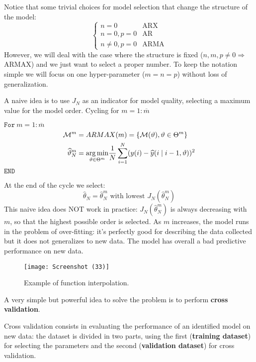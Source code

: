 Notice that some trivial choices for model selection that change the structure of the model:
\begin{equation*}
\begin{cases}
n=0 & \text{ARX}\\
n=0,p=0 & \text{AR}\\
n\neq 0,p=0 & \text{ARMA}
\end{cases}
\end{equation*}
However, we will deal with the case where the structure is fixed ($ n,m,p\neq 0\Longrightarrow$ ARMAX) and we just want to select a proper number. To keep the notation simple we will focus on one hyper-parameter ($ m=n=p$) without loss of generalization.

A naive idea is to use $ J_{N}$ as an indicator for model quality, selecting a maximum value for the model order. Cycling for $ m=1:\overline{m}$

$ \mathtt{For }\ m=1:\overline{m}$
\begin{equation*}
\begin{aligned}
\mathcal{M}^{m} & =ARMAX(m) =\left\{\mathcal{M}(\vartheta) ,\vartheta \in \Theta ^{m}\right\}\\
\widehat{\vartheta }_{N}^{m} & =\underset{\vartheta \in \Theta ^{m}}{\operatorname*{arg\,min}}\frac{1}{N}\sum _{i=1}^{N}(y(i) -\widehat{y}(i\mid i-1,\vartheta))^{2}
\end{aligned}
\end{equation*}
$ \mathtt{END}$

At the end of the cycle we select:
\begin{equation*}
\hat{\theta }_{N} =\hat{\theta }_{N}^{m} \text{ with lowest } J_{N}\left(\hat{\theta }_{N}^{m}\right)
\end{equation*}
This naive idea does NOT work in practice: $ J_{N}\left(\hat{\theta }_{N}^{m}\right)$ is always decreasing with $ m$, so that the highest possible order is selected. As $ m$ increases, the model runs in the problem of over-fitting: it's perfectly good for describing the data collected but it does not generalizes to new data. The model has overall a bad predictive performance on new data.
\begin{figure}[htpb]
    \centering
    \texttt{[image: Screenshot (33)]}
    \caption{Example of function interpolation.}
\end{figure}
\FloatBarrier
A very simple but powerful idea to solve the problem is to perform \textbf{cross validation}.

Cross validation consists in evaluating the performance of an identified model on new data: the dataset is divided in two parts, using the first (\textbf{training dataset}) for selecting the parameters and the second (\textbf{validation dataset}) for cross validation.

